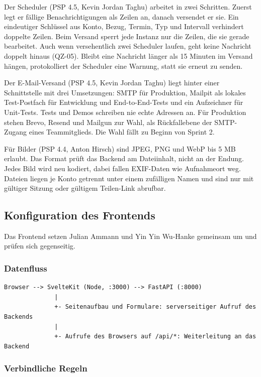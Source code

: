\documentclass[11pt,a4paper]{article}
\renewcommand{\footnotesize}{\fontsize{10}{12}\selectfont}
\begin{document}
Der Scheduler (PSP 4.5, Kevin Jordan Taghu) arbeitet in zwei Schritten. Zuerst legt er fällige Benachrichtigungen als Zeilen an, danach versendet er sie. Ein eindeutiger Schlüssel aus Konto, Bezug, Termin, Typ und Intervall verhindert doppelte Zeilen. Beim Versand sperrt jede Instanz nur die Zeilen, die sie gerade bearbeitet. Auch wenn versehentlich zwei Scheduler laufen, geht keine Nachricht doppelt hinaus (QZ-05). Bleibt eine Nachricht länger als 15 Minuten im Versand hängen, protokolliert der Scheduler eine Warnung, statt sie erneut zu senden.

Der E-Mail-Versand (PSP 4.5, Kevin Jordan Taghu) liegt hinter einer Schnittstelle mit drei Umsetzungen: SMTP für Produktion, Mailpit als lokales Test-Postfach für Entwicklung und End-to-End-Tests und ein Aufzeichner für Unit-Tests. Tests und Demos schreiben nie echte Adressen an. Für Produktion stehen Brevo, Resend und Mailgun zur Wahl, als Rückfallebene der SMTP-Zugang eines Teammitglieds. Die Wahl fällt zu Beginn von Sprint 2.

Für Bilder (PSP 4.4, Anton Hirsch) sind JPEG, PNG und WebP bis 5 MB erlaubt. Das Format prüft das Backend am Dateiinhalt, nicht an der Endung. Jedes Bild wird neu kodiert, dabei fallen EXIF-Daten wie Aufnahmeort weg. Dateien liegen je Konto getrennt unter einem zufälligen Namen und sind nur mit gültiger Sitzung oder gültigem Teilen-Link abrufbar.

\subsection{Konfiguration des Frontends}

Das Frontend setzen Julian Ammann und Yin Yin Wu-Hanke gemeinsam um und prüfen sich gegenseitig.

\subsubsection{Datenfluss}

{\footnotesize
\begin{verbatim}
Browser --> SvelteKit (Node, :3000) --> FastAPI (:8000)
              |
              +- Seitenaufbau und Formulare: serverseitiger Aufruf des Backends
              |
              +- Aufrufe des Browsers auf /api/*: Weiterleitung an das Backend
\end{verbatim}
}

\subsubsection{Verbindliche Regeln}
\end{document}
